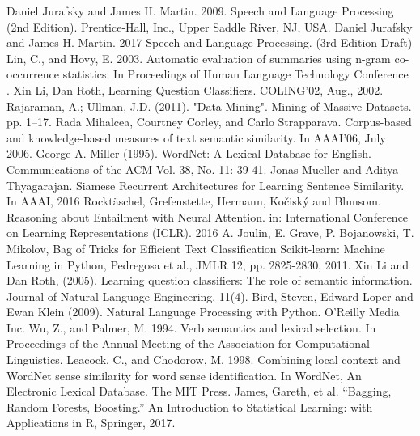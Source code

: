 \documentclass[letterpaper, 10 pt, conference]{ieeeconf}  %
\begin{document}
\begin{thebibliography}{99}

 Daniel Jurafsky and James H. Martin. 2009. Speech and Language Processing (2nd Edition). Prentice-Hall, Inc., Upper Saddle River, NJ, USA.
 Daniel Jurafsky and James H. Martin. 2017 Speech and Language Processing. (3rd Edition Draft) 
 Lin, C., and Hovy, E. 2003. Automatic evaluation of summaries
using n-gram co-occurrence statistics. In Proceedings of Human
Language Technology Conference .
 Xin Li, Dan Roth, Learning Question Classifiers. COLING'02, Aug., 2002.
 Rajaraman, A.; Ullman, J.D. (2011). "Data Mining". Mining of Massive Datasets. pp. 1–17.
 Rada Mihalcea, Courtney Corley, and Carlo Strapparava. Corpus-based and knowledge-based measures of text semantic similarity. In AAAI’06, July 2006.
 George A. Miller (1995). WordNet: A Lexical Database for English. 
Communications of the ACM Vol. 38, No. 11: 39-41.
 Jonas Mueller and Aditya Thyagarajan. Siamese Recurrent Architectures for Learning Sentence Similarity. In AAAI, 2016
 Rocktäschel, Grefenstette, Hermann, Kočiský and Blunsom. Reasoning about Entailment with Neural Attention. in: International Conference on Learning Representations (ICLR). 2016
 A. Joulin, E. Grave, P. Bojanowski, T. Mikolov, Bag of Tricks for Efficient Text Classification
 Scikit-learn: Machine Learning in Python, Pedregosa et al., JMLR 12, pp. 2825-2830, 2011.
 Xin Li and Dan Roth, (2005). Learning question classifiers: The role of semantic information. Journal of Natural Language Engineering, 11(4).
 Bird, Steven, Edward Loper and Ewan Klein (2009). Natural Language Processing with Python.  O'Reilly Media Inc.
 Wu, Z., and Palmer, M. 1994. Verb semantics and lexical selection. In Proceedings of the Annual Meeting of the Association for Computational Linguistics.
 Leacock, C., and Chodorow, M. 1998. Combining local context and WordNet sense similarity for word sense identification. In WordNet, An Electronic Lexical Database. The MIT Press.
 James, Gareth, et al. “Bagging, Random Forests, Boosting.” An Introduction to Statistical Learning: with Applications in R, Springer, 2017.
\end{thebibliography}
\end{document}
